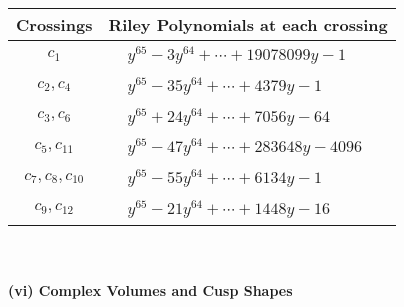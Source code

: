 \documentclass[1p]{elsarticle_modified}
\theoremstyle{definition}
\begin{document}
\begin{tabular}{m{50pt}|m{274pt}}
Crossings & \hspace{64pt}Riley Polynomials at each crossing \\
\hline $$\begin{aligned}c_{1}\end{aligned}$$&$\begin{aligned}
&y^{65}-3 y^{64}+\cdots+19078099 y-1
\end{aligned}$\\
\hline $$\begin{aligned}c_{2},c_{4}\end{aligned}$$&$\begin{aligned}
&y^{65}-35 y^{64}+\cdots+4379 y-1
\end{aligned}$\\
\hline $$\begin{aligned}c_{3},c_{6}\end{aligned}$$&$\begin{aligned}
&y^{65}+24 y^{64}+\cdots+7056 y-64
\end{aligned}$\\
\hline $$\begin{aligned}c_{5},c_{11}\end{aligned}$$&$\begin{aligned}
&y^{65}-47 y^{64}+\cdots+283648 y-4096
\end{aligned}$\\
\hline $$\begin{aligned}c_{7},c_{8},c_{10}\end{aligned}$$&$\begin{aligned}
&y^{65}-55 y^{64}+\cdots+6134 y-1
\end{aligned}$\\
\hline $$\begin{aligned}c_{9},c_{12}\end{aligned}$$&$\begin{aligned}
&y^{65}-21 y^{64}+\cdots+1448 y-16
\end{aligned}$\\
\hline
\end{tabular}\\~\\
\newpage\flushleft \textbf{(vi) Complex Volumes and Cusp Shapes}
\end{document}
